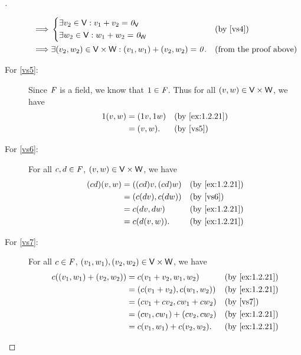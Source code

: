 \begin{proof}[]
\begin{description}
\begin{align*}
        \implies & \begin{dcases}
                     \exists v_2 \in \mathsf{V} : v_1 + v_2 = \mathit{0}_{\mathsf{V}} \\
                     \exists w_2 \in \mathsf{V} : w_1 + w_2 = \mathit{0}_{\mathsf{W}}
                   \end{dcases}                         &  & \text{(by \ref{vs4})}                                         \\
        \implies & \exists (v_2, w_2) \in \mathsf{V} \times \mathsf{W} : (v_1, w_1) + (v_2, w_2) = \mathit{0}. &  & \text{(from the proof above)}
      \end{align*}
    \item[For \ref{vs5}:]
      Since \(\mathit{F}\) is a field, we know that \(1 \in \mathit{F}\).
      Thus for all \((v, w) \in \mathsf{V} \times \mathsf{W}\), we have
      \begin{align*}
        1(v, w) & = (1v, 1w) &  & \by{ex:1.2.21}        \\
                & = (v, w).  &  & \text{(by \ref{vs5})}
      \end{align*}
    \item[For \ref{vs6}:]
      For all \(c, d \in \mathit{F}\), \((v, w) \in \mathsf{V} \times \mathsf{W}\), we have
      \begin{align*}
        (cd) (v, w) & = ((cd) v, (cd) w) &  & \by{ex:1.2.21}        \\
                    & = (c(dv), c(dw))   &  & \text{(by \ref{vs6})} \\
                    & = c (dv, dw)       &  & \by{ex:1.2.21}        \\
                    & = c(d(v, w)).      &  & \by{ex:1.2.21}
      \end{align*}
    \item[For \ref{vs7}:]
      For all \(c \in \mathit{F}\), \((v_1, w_1), (v_2, w_2) \in \mathsf{V} \times \mathsf{W}\), we have
      \begin{align*}
        c ((v_1, w_1) + (v_2, w_2)) & = c (v_1 + v_2, w_1, w_2)     &  & \by{ex:1.2.21}        \\
                                    & = (c(v_1 + v_2), c(w_1, w_2)) &  & \by{ex:1.2.21}        \\
                                    & = (cv_1 + cv_2, cw_1 + cw_2)  &  & \text{(by \ref{vs7})} \\
                                    & = (cv_1, cw_1) + (cv_2, cw_2) &  & \by{ex:1.2.21}        \\
                                    & = c(v_1, w_1) + c(v_2, w_2).  &  & \by{ex:1.2.21}
      \end{align*}

\end{description}
\end{proof}
